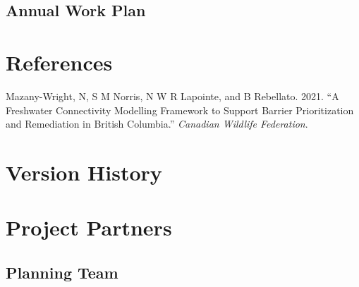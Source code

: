 \documentclass[
  letterpaper,
  DIV=11,
  numbers=noendperiod]{scrreprt}
\newlength{\cslhangindent}
\newenvironment{CSLReferences}[2] %
 {\begin{list}{}{%
  \setlength{\itemindent}{0pt}
  \setlength{\leftmargin}{0pt}
  \setlength{\parsep}{0pt}
  \ifodd #1
   \setlength{\leftmargin}{\cslhangindent}
   \setlength{\itemindent}{-1\cslhangindent}
  \fi
  \setlength{\itemsep}{#2\baselineskip}}}
 {\end{list}}
\begin{document}
\section*{Annual Work Plan}\label{annual-work-plan}



\chapter*{References}\label{references}


\label{refs}
\begin{CSLReferences}{1}{0}
Mazany-Wright, N, S M Norris, N W R Lapointe, and B Rebellato. 2021.
{``A Freshwater Connectivity Modelling Framework to Support Barrier
Prioritization and Remediation in British Columbia.''} \emph{Canadian
Wildlife Federation}.

\end{CSLReferences}


\chapter*{Version History}\label{version-history}


\cleardoublepage
{}
{}
\appendix

\chapter*{Project Partners}\label{project-partners}


\section*{Planning Team}\label{planning-team}

\end{document}
